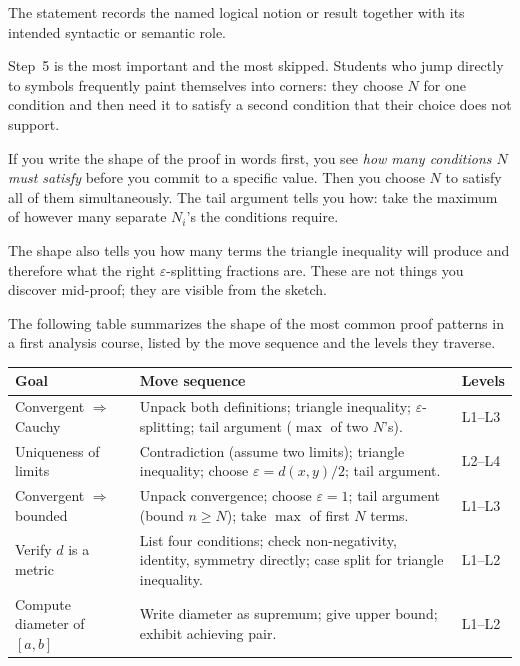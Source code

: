 \begin{remark*}[Interpretation]
The statement records the named logical notion or result together with its
intended syntactic or semantic role.
\end{remark*}


\begin{remark}
Step~5 is the most important and the most skipped. Students who jump
directly to symbols frequently paint themselves into corners: they
choose $N$ for one condition and then need it to satisfy a second
condition that their choice does not support.

If you write the shape of the proof in words first, you see
\emph{how many conditions $N$ must satisfy} before you commit to a
specific value. Then you choose $N$ to satisfy all of them simultaneously.
The tail argument tells you how: take the maximum of however many
separate $N_i$'s the conditions require.

The shape also tells you how many terms the triangle inequality will
produce and therefore what the right $\varepsilon$-splitting fractions
are. These are not things you discover mid-proof; they are visible from
the sketch.
\end{remark}

\begin{remark}
The following table summarizes the shape of the most common proof
patterns in a first analysis course, listed by the move sequence
and the levels they traverse.

\medskip
\begin{center}
\renewcommand{\arraystretch}{1.4}
\small
\begin{tabular}{p{} p{} p{}}
\toprule
\textbf{Goal} & \textbf{Move sequence} & \textbf{Levels} \\
\midrule
Convergent $\Rightarrow$ Cauchy &
  Unpack both definitions; triangle inequality; $\varepsilon$-splitting;
  tail argument ($\max$ of two $N$'s). & L1--L3 \\
Uniqueness of limits &
  Contradiction (assume two limits); triangle inequality; choose
  $\varepsilon = d(x,y)/2$; tail argument. & L2--L4 \\
Convergent $\Rightarrow$ bounded &
  Unpack convergence; choose $\varepsilon = 1$; tail argument
  (bound $n \geq N$); take $\max$ of first $N$ terms. & L1--L3 \\
Verify $d$ is a metric &
  List four conditions; check non-negativity, identity, symmetry directly;
  case split for triangle inequality. & L1--L2 \\
Compute diameter of $[a,b]$ &
  Write diameter as supremum; give upper bound; exhibit achieving pair. & L1--L2 \\
\bottomrule
\end{tabular}
\end{center}
\end{remark}

